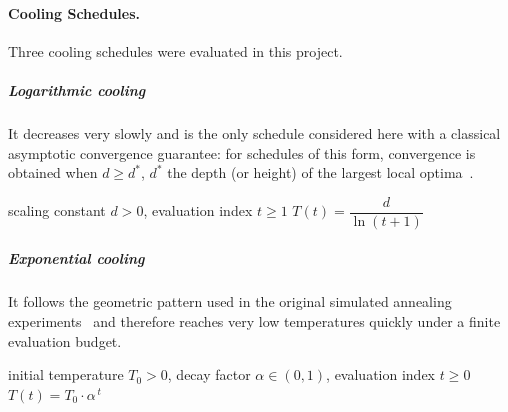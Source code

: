 
\paragraph{Cooling Schedules.}

Three cooling schedules were evaluated in this project.
\subparagraph{Logarithmic cooling}
It decreases very slowly and is the only schedule considered
here with a classical asymptotic
convergence guarantee: for schedules of this form, convergence is
obtained when $d \geq d^{*}$, $d^{*}$ the depth (or height) of the
largest local optima~\cite{hajek1988cooling}.

\begin{algorithm}[H]
  \caption{Logarithmic cooling schedule}
  \label{alg:cool-log}
  \begin{algorithmic}[1]
    \Require scaling constant $d > 0$, evaluation index $t \geq 1$
    \State \Return $T(t) = \dfrac{d}{\ln(t + 1)}$
  \end{algorithmic}
\end{algorithm}

\subparagraph{Exponential cooling}

It follows the geometric pattern used in the original
simulated annealing experiments~\cite{kirkpatrick1983optimization}
and therefore reaches very low temperatures quickly under a finite
evaluation budget.
\begin{algorithm}[H]
  \caption{Exponential cooling schedule}
  \label{alg:cool-exp}
  \begin{algorithmic}[1]
    \Require initial temperature $T_0 > 0$, decay factor $\alpha \in (0,1)$,
    evaluation index $t \geq 0$
    \State \Return $T(t) = T_0 \cdot \alpha^{\,t}$
  \end{algorithmic}
\end{algorithm}


